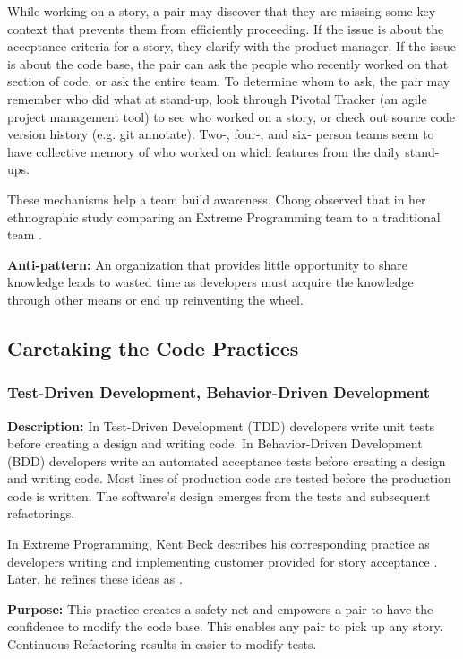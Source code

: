 While working on a story, a pair may discover that they are missing some key context that prevents them from efficiently proceeding. If the issue is about the acceptance criteria for a story, they clarify with the product manager. If the issue is about the code base, the pair can ask the people who recently worked on that section of code, or ask the entire team. To determine whom to ask, the pair may remember who did what at stand-up, look through Pivotal Tracker (an agile project management tool) to see who worked on a story, or check out source code version history (e.g. git annotate). Two-, four-, and six- person teams seem to have collective memory of who worked on which features from the daily stand-ups. 

These mechanisms help a team build awareness. Chong observed that  in her ethnographic study comparing an Extreme Programming team to a traditional team \cite{ChongNominum}.
 
\textbf{Anti-pattern:} An organization that provides little opportunity to share knowledge leads to wasted time as developers must acquire the knowledge through other means or end up reinventing the wheel.
\subsection{Caretaking the Code Practices}
\subsubsection{Test-Driven Development, Behavior-Driven Development}
\textbf{Description:} In Test-Driven Development (TDD) developers write unit tests before creating a design and writing code. In Behavior-Driven Development (BDD) developers write an automated acceptance tests before creating a design and writing code. Most lines of production code are tested before the production code is written. The software's design emerges from the tests and subsequent refactorings.

In Extreme Programming, Kent Beck describes his corresponding  practice as developers writing  and implementing customer provided  for story acceptance \cite{BeckExtremeProgramming1999}. Later, he refines these ideas as  \cite{BeckExtremeProgramming2004}. 

\textbf{Purpose:} This practice creates a safety net and empowers a pair to have the confidence to modify the code base. This enables any pair to pick up any story. Continuous Refactoring results in easier to modify tests.

